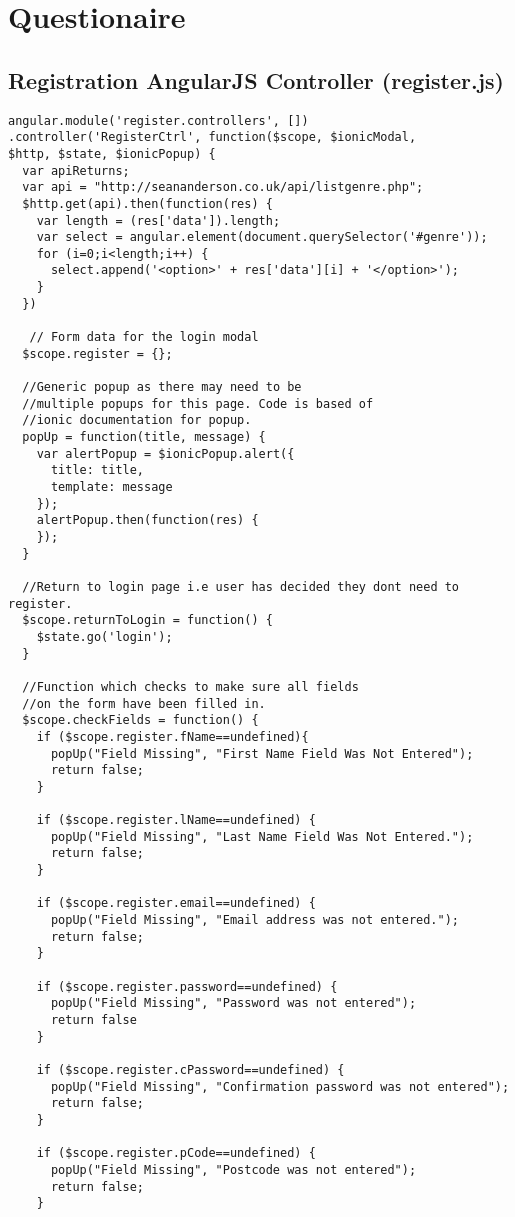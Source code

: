 \chapter{Questionaire }
\section{Registration AngularJS Controller (register.js)}
\begin{verbatim}
angular.module('register.controllers', [])
.controller('RegisterCtrl', function($scope, $ionicModal, 
$http, $state, $ionicPopup) {
  var apiReturns;
  var api = "http://seananderson.co.uk/api/listgenre.php";
  $http.get(api).then(function(res) {
    var length = (res['data']).length;
    var select = angular.element(document.querySelector('#genre'));
    for (i=0;i<length;i++) {
      select.append('<option>' + res['data'][i] + '</option>');
    }
  })

   // Form data for the login modal
  $scope.register = {};

  //Generic popup as there may need to be 
  //multiple popups for this page. Code is based of 
  //ionic documentation for popup.
  popUp = function(title, message) {
    var alertPopup = $ionicPopup.alert({
      title: title,
      template: message
    });
    alertPopup.then(function(res) {
    });
  }

  //Return to login page i.e user has decided they dont need to register.
  $scope.returnToLogin = function() {
    $state.go('login');
  }

  //Function which checks to make sure all fields 
  //on the form have been filled in.
  $scope.checkFields = function() {
    if ($scope.register.fName==undefined){
      popUp("Field Missing", "First Name Field Was Not Entered");
      return false;
    }

    if ($scope.register.lName==undefined) {
      popUp("Field Missing", "Last Name Field Was Not Entered.");
      return false;
    }

    if ($scope.register.email==undefined) {
      popUp("Field Missing", "Email address was not entered.");
      return false;
    }

    if ($scope.register.password==undefined) {
      popUp("Field Missing", "Password was not entered");
      return false
    }

    if ($scope.register.cPassword==undefined) {
      popUp("Field Missing", "Confirmation password was not entered");
      return false;
    }

    if ($scope.register.pCode==undefined) {
      popUp("Field Missing", "Postcode was not entered");
      return false;
    }


\end{verbatim}
